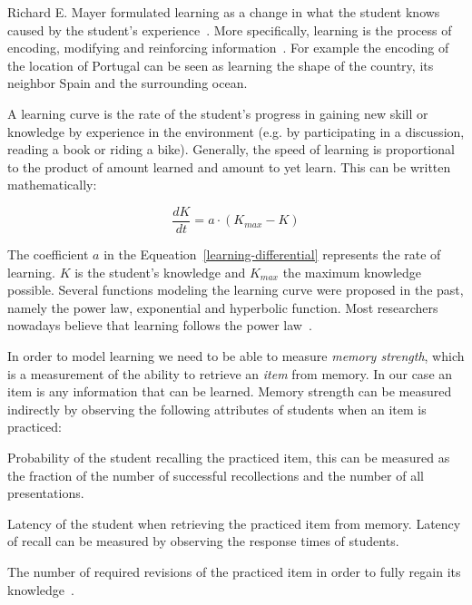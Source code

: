 Richard E. Mayer formulated learning as a change in what the student knows caused by the student's experience~\cite{RichardE.Mayer2010}. More specifically, learning is the process of encoding, modifying and reinforcing information~\cite{Lewis}. For example the encoding of the location of Portugal can be seen as learning the shape of the country, its neighbor Spain and the surrounding ocean.

A learning curve is the rate of the student's progress in gaining new skill or knowledge by experience in the environment (e.g. by participating in a discussion, reading a book or riding a bike). Generally, the speed of learning is proportional to the product of amount learned and amount to yet learn. This can be written mathematically:

\begin{equation} \label{learning-differential}
  \frac{dK}{dt} = a \cdot (K_{max} - K)
\end{equation}

The coefficient $a$ in the Equeation~\ref{learning-differential} represents the rate of learning. $K$ is the student's knowledge and $K_{max}$ the maximum knowledge possible. Several functions modeling the learning curve were proposed in the past, namely the power law, exponential and hyperbolic function. Most researchers nowadays believe that learning follows the power law~\cite{Klusasek2014}.

In order to model learning we need to be able to measure \textit{memory strength}, which is a measurement of the ability to retrieve an \textit{item} from memory. In our case an item is any information that can be learned. Memory strength can be measured indirectly by observing the following attributes of students when an item is practiced:

\begin{description}[leftmargin=0cm]
  \item[Probability of recall] Probability of the student recalling the practiced item, this can be measured as the fraction of the number of successful recollections and the number of all presentations.
  \item[Latency of recall] Latency of the student when retrieving the practiced item from memory. Latency of recall can be measured by observing the response times of students.
  \item[Savings in relearning] The number of required revisions of the practiced item in order to fully regain its knowledge~\cite{MichaelW.Eysenck2008}.
\end{description}

